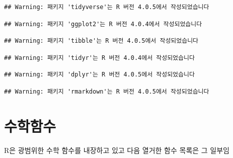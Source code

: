 \documentclass[
  11pt,
]{krantz}
\begin{document}
\begin{verbatim}
## Warning: 패키지 'tidyverse'는 R 버전 4.0.5에서 작성되었습니다
\end{verbatim}

\begin{verbatim}
## Warning: 패키지 'ggplot2'는 R 버전 4.0.4에서 작성되었습니다
\end{verbatim}

\begin{verbatim}
## Warning: 패키지 'tibble'는 R 버전 4.0.5에서 작성되었습니다
\end{verbatim}

\begin{verbatim}
## Warning: 패키지 'tidyr'는 R 버전 4.0.4에서 작성되었습니다
\end{verbatim}

\begin{verbatim}
## Warning: 패키지 'dplyr'는 R 버전 4.0.5에서 작성되었습니다
\end{verbatim}

\begin{verbatim}
## Warning: 패키지 'rmarkdown'는 R 버전 4.0.5에서 작성되었습니다
\end{verbatim}

\hypertarget{uxc218uxd559uxd568uxc218}{%
\section{수학함수}\label{uxc218uxd559uxd568uxc218}}

R은 광범위한 수학 함수를 내장하고 있고 다음 열거한 함수 목록은 그 일부임
\end{document}
